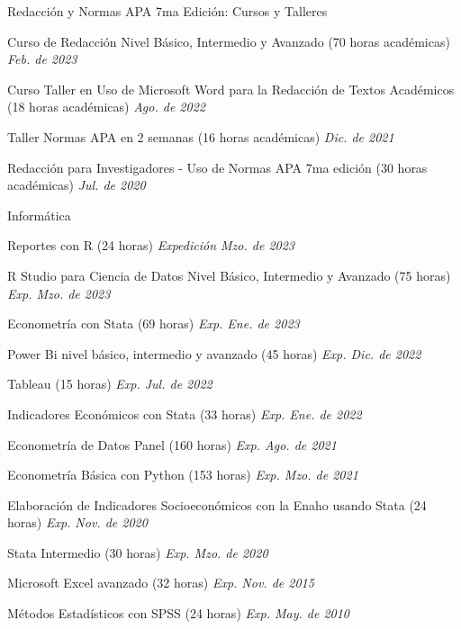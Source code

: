 \documentclass[
11pt, %
]{resume} %
\begin{document}
		
		\begin{rSection}{Redacción y Normas APA 7ma Edición: Cursos y Talleres}
			\item Curso de Redacción Nivel Básico, Intermedio y Avanzado (70 horas académicas) \hfill \textit{Feb. de 2023} \ 
			\item Curso Taller en Uso de Microsoft Word para la Redacción de Textos Académicos (18 horas académicas) \hfill \textit{Ago. de 2022} \ 
			\item Taller Normas APA en 2 semanas (16 horas académicas) \hfill \textit{Dic. de 2021} \ 
			\item Redacción para Investigadores - Uso de Normas APA 7ma edición (30 horas académicas) \hfill \textit{Jul. de 2020}  
		\end{rSection}
		
		
		\begin{rSection}{Informática}
			\item Reportes con R (24 horas) \hfill \textit{Expedición Mzo. de 2023} \
			\item R Studio para Ciencia de Datos Nivel Básico, Intermedio y Avanzado (75 horas) \hfill \textit{Exp. Mzo. de 2023} \ 
			\item Econometría con Stata (69 horas) \hfill \textit{Exp. Ene. de 2023} \
			\item Power Bi nivel básico, intermedio y avanzado (45 horas) \hfill \textit{Exp. Dic. de 2022}
			\item Tableau (15 horas) \hfill \textit{Exp. Jul. de 2022}
			\item Indicadores Económicos con Stata (33 horas) \hfill \textit{Exp. Ene. de 2022} 
			\item Econometría de Datos Panel (160 horas) \hfill \textit{Exp. Ago. de 2021}
			\item Econometría Básica con Python (153 horas) \hfill \textit{Exp. Mzo. de 2021}
			\item Elaboración de Indicadores Socioeconómicos con la Enaho usando Stata (24 horas) \hfill \textit{Exp. Nov. de 2020}
			\item Stata Intermedio (30 horas) \hfill \textit{Exp. Mzo. de 2020}
			\item Microsoft Excel avanzado (32 horas) \hfill \textit{Exp. Nov. de 2015}
			\item Métodos Estadísticos con SPSS (24 horas)  \hfill \textit{Exp. May. de 2010} \
			
		\end{rSection}
		
\end{document}
